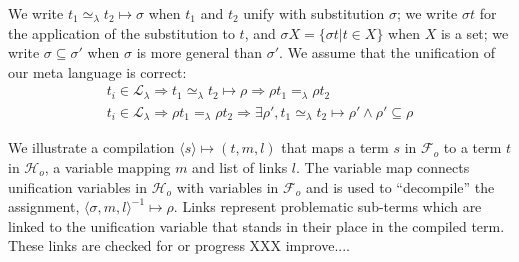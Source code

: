 \documentclass[sigconf,natbib=false,review]{acmart}
\newcommand{\EqualRel}{\ensuremath{=}}
\newcommand{\UnifRel}{\ensuremath{\simeq}}
\newcommand{\Ue}{\ensuremath{\UnifRel_\lambda}\xspace}
\newcommand{\Ee}{\ensuremath{\EqualRel_\lambda}\xspace}
\newcommand{\llambda}{\ensuremath{\mathcal{L}_\lambda}\xspace}
\newcommand{\Fo}{\ensuremath{\mathcal{F}_{\!o}\xspace}} %
\newcommand{\Ho}{\ensuremath{\mathcal{H}_o}\xspace}
\begin{document}
\newcommand{\unifcorrect}[3]{
    #3_i \in \llambda \Rightarrow
      #3_1 #2 #3_2 \mapsto \rho
        \Rightarrow 
          \rho #3_1 #1 \rho #3_2  %
}

\newcommand{\unifcomplete}[3]{
    #3_i \in \llambda \Rightarrow
        \rho #3_1 #1 \rho #3_2  %
          \Rightarrow \exists \rho', #3_1 #2 #3_2 \mapsto \rho' \land \rho' \subseteq \rho 
}

We write $t_1 \Ue t_2 \mapsto \sigma$ when $t_1$ and $t_2$ unify
with substitution $\sigma$; we write $\sigma t$ for the application of
the substitution to $t$, and $\sigma X = \{ \sigma t | t \in X\}$ when
$X$ is a set; we write $\sigma \subseteq \sigma'$ when $\sigma$ is more
general than $\sigma'$. We assume that the unification of our meta
language is correct:
%
\begin{gather}
  \unifcorrect{\Ee}{\Ue}{t} \label{prop:correct-ml}\\
  \unifcomplete{\Ee}{\Ue}{t}
\end{gather}

\newcommand{\C}[4]{\ensuremath{\langle #1 \rangle}\mapsto(#2,#3,#4)}
\newcommand{\D}[4]{\ensuremath{\langle #1,#2,#3 \rangle^{-1}\mapsto #4}}

We illustrate a compilation $\C{s}{t}{m}{l}$ that
maps a term $s$ in \Fo{} to a term $t$ in \Ho, a variable mapping $m$ and
list of links $l$.
The variable map connects unification variables in \Ho with variables
in \Fo{} and is used to ``decompile'' the assignment,
$\D{\sigma}{m}{l}{\rho}$. Links represent problematic sub-terms which
are linked to the unification variable that stands in their place in the
compiled term. These links are checked for or progress XXX improve....
\end{document}
